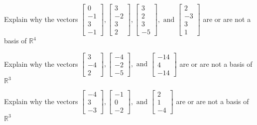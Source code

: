 \documentclass{article}
\begin{document}
\begin{exerciseStatement}
    Explain why the vectors \(\left[\begin{array}{r}
0 \\
-1 \\
3 \\
-1
\end{array}\right] , \left[\begin{array}{r}
3 \\
-2 \\
3 \\
2
\end{array}\right] , \left[\begin{array}{r}
3 \\
2 \\
3 \\
-5
\end{array}\right] , \text{ and } \left[\begin{array}{r}
2 \\
-3 \\
3 \\
1
\end{array}\right]\) are or are not a basis of \(\mathbb{R}^4\)


  
\end{exerciseStatement}

\begin{exerciseStatement}
    Explain why the vectors \(\left[\begin{array}{r}
3 \\
-4 \\
2
\end{array}\right] , \left[\begin{array}{r}
-4 \\
-2 \\
-5
\end{array}\right] , \text{ and } \left[\begin{array}{r}
-14 \\
4 \\
-14
\end{array}\right]\) are or are not a basis of \(\mathbb{R}^3\)


  
\end{exerciseStatement}

\begin{exerciseStatement}
    Explain why the vectors \(\left[\begin{array}{r}
-4 \\
3 \\
-3
\end{array}\right] , \left[\begin{array}{r}
-1 \\
0 \\
-2
\end{array}\right] , \text{ and } \left[\begin{array}{r}
2 \\
1 \\
-4
\end{array}\right]\) are or are not a basis of \(\mathbb{R}^3\)


  
\end{exerciseStatement}
\end{document}
